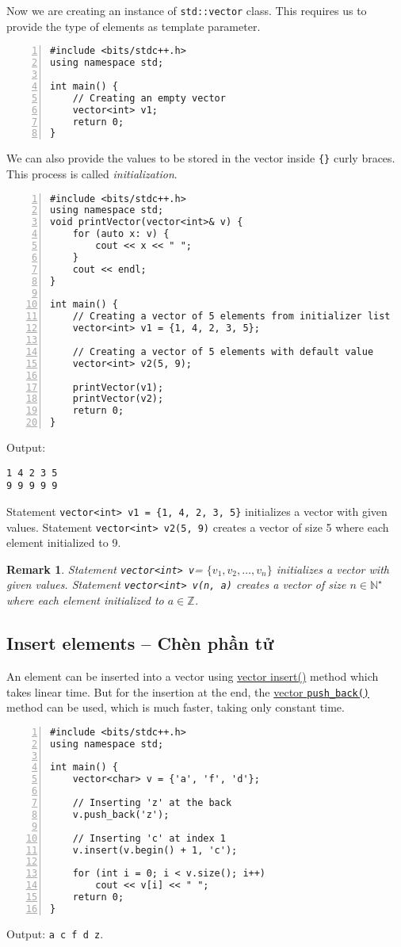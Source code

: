 \documentclass{article}
\newtheorem{remark}{Remark}
\begin{document}
Now we are creating an instance of {\tt std::vector} class. This requires us to provide the type of elements as template parameter.
\begin{Verbatim}[numbers=left,xleftmargin=5mm]
#include <bits/stdc++.h>
using namespace std;

int main() {
    // Creating an empty vector
    vector<int> v1;	
    return 0;
}
\end{Verbatim}
We can also provide the values to be stored in the vector inside {\tt\{\}} curly braces. This process is called {\it initialization}.
\begin{Verbatim}[numbers=left,xleftmargin=5mm]
#include <bits/stdc++.h>
using namespace std;
void printVector(vector<int>& v) {
    for (auto x: v) {
        cout << x << " ";
    }
    cout << endl;
}

int main() {	
    // Creating a vector of 5 elements from initializer list
    vector<int> v1 = {1, 4, 2, 3, 5};
	
    // Creating a vector of 5 elements with default value
	vector<int> v2(5, 9);
	
    printVector(v1);
    printVector(v2);
	return 0;
}
\end{Verbatim}
Output:
\begin{verbatim}
1 4 2 3 5 
9 9 9 9 9
\end{verbatim}
Statement \verb|vector<int> v1 = {1, 4, 2, 3, 5}| initializes a vector with given values. Statement \verb|vector<int> v2(5, 9)| creates a vector of size 5 where each element initialized to 9.

\begin{remark}
	Statement \verb|vector<int> v|= $\{v_1,v_2,\ldots,v_n\}$ initializes a vector with given values. Statement \verb|vector<int> v(n, a)| creates a vector of size $n\in\mathbb{N}^\star$ where each element initialized to $a\in\mathbb{Z}$.
\end{remark}


\subsection{Insert elements -- Chèn phần tử}
An element can be inserted into a vector using \href{https://www.geeksforgeeks.org/vector-insert-function-in-cpp-stl}{vector insert()} method which takes linear time. But for the insertion at the end, the \href{https://www.geeksforgeeks.org/vectorpush_back-vectorpop_back-c-stl/}{vector {\tt push\_back()}} method can be used, which is much faster, taking only constant time.
\begin{Verbatim}[numbers=left,xleftmargin=5mm]
#include <bits/stdc++.h>
using namespace std;

int main() {
    vector<char> v = {'a', 'f', 'd'};
	
    // Inserting 'z' at the back
    v.push_back('z');
	
    // Inserting 'c' at index 1
    v.insert(v.begin() + 1, 'c');
	
    for (int i = 0; i < v.size(); i++)
        cout << v[i] << " ";
    return 0;
}
\end{Verbatim}
Output: {\tt a c f d z}.
\end{document}
